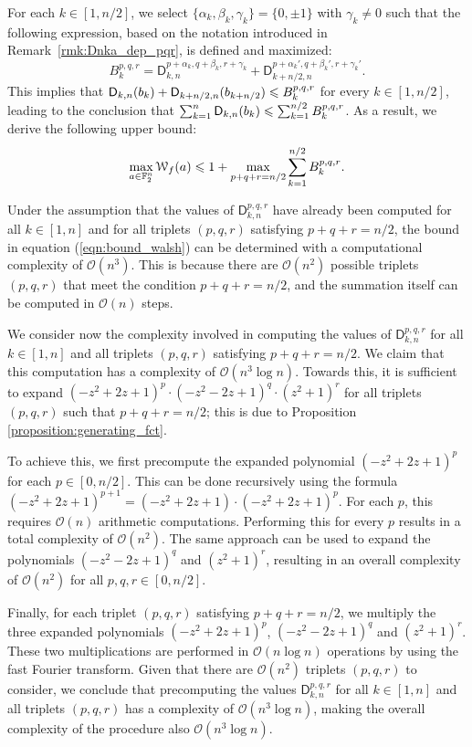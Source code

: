 \documentclass{llncs}
\begin{document}
For each $k\in[1,n/2]$, we select $\{\alpha_k,\beta_k,\gamma_k\}=\{0,\pm 1\}$ with $\gamma_k\neq 0$ such that the following expression, based on the notation introduced in Remark~\ref{rmk:Dnka_dep_pqr}, is defined and maximized:
\[
	B_k^{p,q,r}=\mathsf D_{k,n}^{p+\alpha_k,q+\beta_k,r+\gamma_k}+\mathsf D_{k+n/2,n}^{p+\alpha_k',q+\beta_k',r+\gamma_k'}.
\]
This implies that $\Dnka{n}{k}{b_k}+\Dnka{n}{k+n/2}{b_{k+n/2}}\leq B_k^{p,q,r}$ for every $k\in[1,n/2]$, leading to the conclusion that $\sum_{k=1}^n\Dnka nk{b_k}\leq\sum_{k=1}^{n/2} B_k^{p,q,r}$. As a result, we derive the following upper bound:
\begin{equation}\label{eqn:bound_walsh}
	\max_{a\in\F_2^n}\wt f(a)\leq 1+\max_{p+q+r=n/2}\sum_{k=1}^{n/2} B_k^{p,q,r}.
\end{equation}

Under the assumption that the values of $\mathsf{D}_{k,n}^{p,q,r}$ have already been computed for all $k\in[1,n]$ and for all triplets $(p,q,r)$ satisfying $p+q+r=n/2$, the bound in equation (\ref{eqn:bound_walsh}) can be determined with a computational complexity of $\mathcal{O}(n^3)$. This is because there are $\mathcal{O}(n^2)$ possible triplets $(p,q,r)$ that meet the condition $p+q+r=n/2$, and the summation itself can be computed in $\mathcal{O}(n)$ steps.

We consider now the complexity involved in computing the values of $\mathsf{D}_{k,n}^{p,q,r}$ for all $k\in[1,n]$ and all triplets $(p,q,r)$ satisfying $p+q+r=n/2$. We claim that this computation has a complexity of $\mathcal{O}(n^3 \log n)$. Towards this, it is sufficient to expand $(-z^2 + 2z + 1)^p \cdot (-z^2 - 2z + 1)^q \cdot (z^2 + 1)^r$ for all triplets $(p,q,r)$ such that $p+q+r=n/2$; this is due to Proposition \ref{proposition:generating_fct}.

To achieve this, we first precompute the expanded polynomial $(-z^2 + 2z + 1)^p$ for each $p\in[0,n/2]$. This can be done recursively using the formula $(-z^2 + 2z + 1)^{p+1} = (-z^2 + 2z + 1) \cdot (-z^2 + 2z + 1)^p$. For each $p$, this requires $\mathcal O(n)$ arithmetic computations. Performing this for every $p$ results in a total complexity of $\mathcal{O}(n^2)$. The same approach can be used to expand the polynomials $(-z^2 - 2z + 1)^q$ and $(z^2 + 1)^r$, resulting in an overall complexity of $\mathcal{O}(n^2)$ for all $p,q,r\in[0,n/2]$. 

Finally, for each triplet $(p,q,r)$ satisfying $p+q+r=n/2$, we multiply the three expanded polynomials $(-z^2 + 2z + 1)^p$, $(-z^2 - 2z + 1)^q$ and $(z^2 + 1)^r$. These two multiplications are performed in $\mathcal{O}(n \log n)$ operations by using the fast Fourier transform. Given that there are $\mathcal{O}(n^2)$ triplets $(p,q,r)$ to consider, we conclude that precomputing the values $\mathsf{D}_{k,n}^{p,q,r}$ for all $k\in[1,n]$ and all triplets $(p,q,r)$ has a complexity of $\mathcal{O}(n^3 \log n)$, making the overall complexity of the procedure also $\mathcal{O}(n^3 \log n)$.
\end{document}
